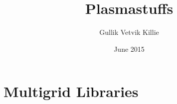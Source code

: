 \documentclass[x11names,twoside,english]{uiofysmaster}
\author{Gullik Vetvik Killie}
\title{Plasmastuffs}
\date{June 2015}
\begin{document}
% 


% 



% 

% 

% 

\appendix
% 
% 
% 
\chapter{Multigrid Libraries}




\printbibliography
\end{document}
